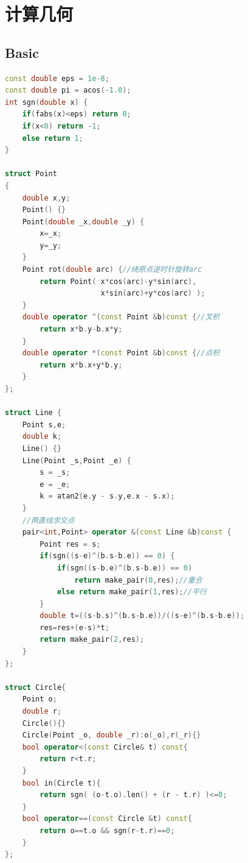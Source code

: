 \documentclass[UTF8,a4paper,titlepage]{ctexart}
\begin{document}
\section{计算几何}
\subsection{Basic}
\begin{lstlisting}[language=C++]
const double eps = 1e-8;
const double pi = acos(-1.0);
int sgn(double x) {
    if(fabs(x)<eps) return 0;
    if(x<0) return -1;
    else return 1;
}

struct Point
{
    double x,y;
    Point() {}
    Point(double _x,double _y) {
        x=_x;
        y=_y;
    }
    Point rot(double arc) {//绕原点逆时针旋转arc
        return Point( x*cos(arc)-y*sin(arc),
                      x*sin(arc)+y*cos(arc) );
    }
    double operator ^(const Point &b)const {//叉积
        return x*b.y-b.x*y;
    }
    double operator *(const Point &b)const {//点积
        return x*b.x+y*b.y;
    }
};

struct Line {
    Point s,e;
    double k;
    Line() {}
    Line(Point _s,Point _e) {
        s = _s;
        e = _e;
        k = atan2(e.y - s.y,e.x - s.x);
    }
    //两直线求交点
    pair<int,Point> operator &(const Line &b)const {
        Point res = s;
        if(sgn((s-e)^(b.s-b.e)) == 0) {
            if(sgn((s-b.e)^(b.s-b.e)) == 0)
                return make_pair(0,res);//重合
            else return make_pair(1,res);//平行
        }
        double t=((s-b.s)^(b.s-b.e))/((s-e)^(b.s-b.e));
        res=res+(e-s)*t;
        return make_pair(2,res);
    }
};

struct Circle{
    Point o;
    double r;
    Circle(){}
    Circle(Point _o, double _r):o(_o),r(_r){}
    bool operator<(const Circle& t) const{
        return r<t.r;
    }
    bool in(Circle t){
        return sgn( (o-t.o).len() + (r - t.r) )<=0;
    }
    bool operator==(const Circle &t) const{
        return o==t.o && sgn(r-t.r)==0;
    }
};


\end{lstlisting}
\end{document}
